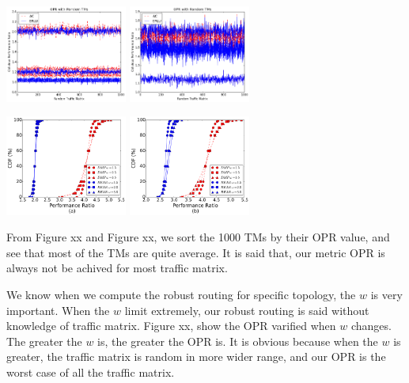 \documentclass[conference]{IEEEtran}
\begin{document}
\vspace*{0.2in}
\includegraphics[width=4cm]{exp2_nosort_abilene}
\includegraphics[width=4cm]{exp2_nosort_geant}
\vspace*{0.2in}


\vspace*{0.2in}
\includegraphics[width=4cm]{exp2_sort_abilene}
\includegraphics[width=4cm]{exp2_sort_geant}
\vspace*{0.2in}

From Figure xx and Figure xx, we sort the 1000 TMs by their OPR value, and see that most of the TMs are quite average. 
It is said that, our metric OPR is always not be achived for most traffic matrix.


We know when we compute the robust routing for specific topology, the $w$ is very important. When the $w$ limit extremely,
our robust routing is said without knowledge of traffic matrix. Figure xx, show the OPR varified when $w$ changes. The greater
the $w$ is, the greater the OPR is. It is obvious because when the $w$ is greater, the traffic matrix is random in more wider 
range, and our OPR is the worst case of all the traffic matrix.
\end{document}
